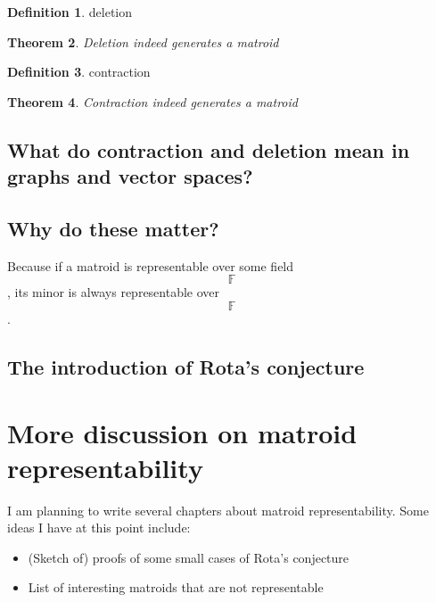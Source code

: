 \documentclass[psamsfonts]{amsart}
\newtheorem{thm}{Theorem}[section]
\theoremstyle{definition}
\newtheorem{defn}[thm]{Definition}
\theoremstyle{remark}
\numberwithin{equation}{section}
\begin{document}
\begin{defn}
deletion
\end{defn}

\begin{thm}
Deletion indeed generates a matroid
\end{thm}

\begin{defn}
contraction
\end{defn}

\begin{thm}
Contraction indeed generates a matroid
\end{thm}

\subsection{What do contraction and deletion mean in graphs and vector spaces?}

\subsection{Why do these matter?}
Because if a matroid is representable over some field $$\mathbb{F}$$, its minor is always representable over $$\mathbb{F}$$.

\subsection{The introduction of Rota's conjecture}

\section{More discussion on matroid representability}
I am planning to write several chapters about matroid representability.
Some ideas I have at this point include:

\begin{itemize}
\item (Sketch of) proofs of some small cases of Rota's conjecture
\item List of interesting matroids that are not representable
\end{itemize}
\end{document}
